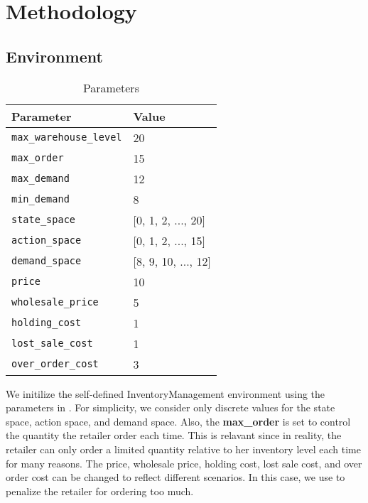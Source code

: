 \section{Methodology}
\subsection{Environment}
\begin{table}[H]
    \centering
    \begin{tabular}{|l|l|}
        \hline
        \textbf{Parameter}             & \textbf{Value}      \\
        \hline
        \texttt{max\_warehouse\_level} & 20                  \\
        \texttt{max\_order}            & 15                  \\
        \texttt{max\_demand}           & 12                  \\
        \texttt{min\_demand}           & 8                   \\
        \texttt{state\_space}          & [0, 1, 2, ..., 20]  \\
        \texttt{action\_space}         & [0, 1, 2, ..., 15]  \\
        \texttt{demand\_space}         & [8, 9, 10, ..., 12] \\
        \texttt{price}                 & 10                  \\
        \texttt{wholesale\_price}      & 5                   \\
        \texttt{holding\_cost}         & 1                   \\
        \texttt{lost\_sale\_cost}      & 1                   \\
        \texttt{over\_order\_cost}     & 3                   \\
        \hline
    \end{tabular}
    \caption{Parameters}
    \label{tab:pars}
\end{table}
We initilize the self-defined InventoryManagement environment using the parameters in . For simplicity, we consider only discrete values for the state space, action space, and demand space. Also, the \textbf{max\_order} is set to control the quantity the retailer order each time. This is relavant since in reality, the retailer can only order a limited quantity relative to her inventory level each time for many reasons. The price, wholesale price, holding cost, lost sale cost, and over order cost can be changed to reflect different scenarios. In this case, we use  to penalize the retailer for ordering too much. 


